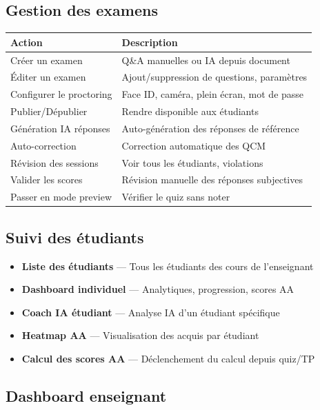 \documentclass[12pt,a4paper]{article}
\begin{document}
\subsection{Gestion des examens}

\begin{longtable}{@{}p{5cm}p{9.5cm}@{}}
\toprule
\textbf{Action} & \textbf{Description} \\
\midrule
\endhead
Créer un examen & Q\&A manuelles ou IA depuis document \\
Éditer un examen & Ajout/suppression de questions, paramètres \\
Configurer le proctoring & Face ID, caméra, plein écran, mot de passe \\
Publier/Dépublier & Rendre disponible aux étudiants \\
Génération IA réponses & Auto-génération des réponses de référence \\
Auto-correction & Correction automatique des QCM \\
Révision des sessions & Voir tous les étudiants, violations \\
Valider les scores & Révision manuelle des réponses subjectives \\
Passer en mode preview & Vérifier le quiz sans noter \\
\bottomrule
\end{longtable}

\subsection{Suivi des étudiants}

\begin{itemize}
    \item \textbf{Liste des étudiants} --- Tous les étudiants des cours de l'enseignant
    \item \textbf{Dashboard individuel} --- Analytiques, progression, scores AA
    \item \textbf{Coach IA étudiant} --- Analyse IA d'un étudiant spécifique
    \item \textbf{Heatmap AA} --- Visualisation des acquis par étudiant
    \item \textbf{Calcul des scores AA} --- Déclenchement du calcul depuis quiz/TP
\end{itemize}

\subsection{Dashboard enseignant}
\end{document}
